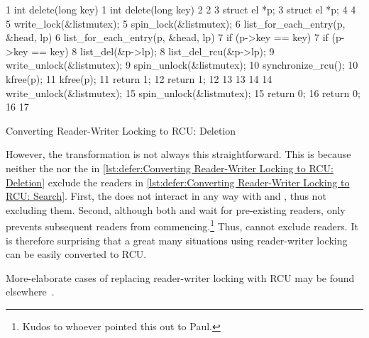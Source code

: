 \begin{listing*}
{ \scriptsize
\begin{verbbox}
 1 int delete(long key)                  1 int delete(long key)
 2 {                                     2 {
 3   struct el *p;                       3   struct el *p;
 4                                       4
 5   write_lock(&listmutex);             5   spin_lock(&listmutex);
 6   list_for_each_entry(p, &head, lp) { 6   list_for_each_entry(p, &head, lp) {
 7     if (p->key == key) {              7     if (p->key == key) {
 8       list_del(&p->lp);               8       list_del_rcu(&p->lp);
 9       write_unlock(&listmutex);       9       spin_unlock(&listmutex);
                                        10       synchronize_rcu();
10       kfree(p);                      11       kfree(p);
11       return 1;                      12       return 1;
12     }                                13     }
13   }                                  14   }
14   write_unlock(&listmutex);          15   spin_unlock(&listmutex);
15   return 0;                          16   return 0;
16 }                                    17 }
\end{verbbox}
}
\hspace*{0.9in}\OneColumnHSpace{-0.5in}
\IfEbookSize{\hspace*{-1.05in}}{}\theverbbox
\caption{Converting Reader-Writer Locking to RCU\@:
						    Deletion}
\label{lst:defer:Converting Reader-Writer Locking to RCU: Deletion}
\end{listing*}

However, the transformation is not always this straightforward.
This is because neither the  nor the
 in
\cref{lst:defer:Converting Reader-Writer Locking to RCU: Deletion}
exclude the readers in
\cref{lst:defer:Converting Reader-Writer Locking to RCU: Search}.
First, the  does not interact in any way with
 and , thus not excluding them.
Second, although both  and 
wait for pre-existing readers, only  prevents
subsequent readers from commencing.\footnote{
	Kudos to whoever pointed this out to Paul.}
Thus,  cannot exclude readers.
It is therefore surprising that a great many situations
using reader-writer locking can be easily converted to RCU\@.

More-elaborate cases of replacing reader-writer locking with RCU
may be found
elsewhere~\cite{NeilBrown2015PathnameLookup,NeilBrown2015RCUwalk}.

